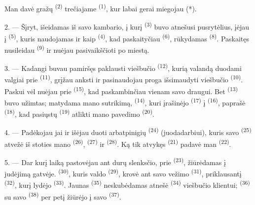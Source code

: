 Man davė gražų  \textsuperscript{(2)} trečiajame 
\textsuperscript{(1)}, kur labai gerai miegojau (*).

2. --- Šįryt, išeidamas iš savo kambario, į kurį 
\textsuperscript{(3)} buvo atnešusi pusrytėlius, įėjau į 
\textsuperscript{(5)}, kuris naudojamas ir kaip 
\textsuperscript{(4)}, kad paskaityčiau  \textsuperscript{(6)},
rūkydamas  \textsuperscript{(8)}. Paskaitęs nusileidau
 \textsuperscript{(9)} ir nuėjau pasivaikščioti po miestą.

3. --- Kadangi buvau pamiršęs paklausti viešbučio 
\textsuperscript{(12)}, kurią valandą duodami valgiai prie 
\textsuperscript{(11)}, grįžau anksti ir pasinaudojau proga išsimaudyti viešbučio
 \textsuperscript{(10)}. Paskui vėl nuėjau prie 
\textsuperscript{(15)}, kad paskambinčiau vienam savo draugui. Bet 
\textsuperscript{(13)} buvo užimtas; matydama mano sutrikimą, 
\textsuperscript{(14)}, kuri įrašinėjo  \textsuperscript{(17)} į
 \textsuperscript{(16)}, paprašė 
\textsuperscript{(18)}, kad pasiųstų  \textsuperscript{(19)}
atlikti mano pavedimo  \textsuperscript{(20)}.

4. --- Padėkojau jai ir išėjau duoti arbatpinigių 
\textsuperscript{(24)} (juodadarbiui), kuris savo 
\textsuperscript{(25)} atvežė iš stoties mano 
\textsuperscript{(26)},  \textsuperscript{(27)} ir  \textsuperscript{(28)}. Ką tik atvykęs 
\textsuperscript{(21)} padavė man  \textsuperscript{(22)}.

5. --- Dar kurį laiką pastovėjau ant durų slenksčio, prie 
\textsuperscript{(23)}, žiūrėdamas į judėjimą gatvėje. 
\textsuperscript{(30)}, kuris valdo  \textsuperscript{(29)}, krovė ant
savo vežimo  \textsuperscript{(31)}, priklausantį 
\textsuperscript{(32)}, kurį lydėjo 
\textsuperscript{(33)}. Jaunas  \textsuperscript{(35)} neskubėdamas
atnešė  \textsuperscript{(34)} viešbučio klientui;
 \textsuperscript{(36)} su savo 
\textsuperscript{(38)} per petį žiūrėjo į savo 
\textsuperscript{(37)}.

